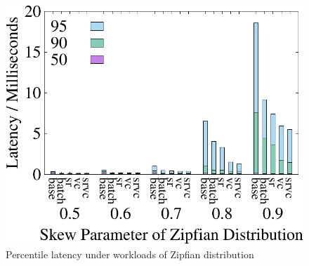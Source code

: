 \begin{figure}[t]
\begin{minipage}[b]{0.31\linewidth}
    	\label{fig:basic:latency}
    \end{minipage}
    \begin{minipage}[b]{0.31\linewidth}
    	\centering
    	\includegraphics[width=\textwidth]{./exp_fig/basic/percent95_latency}
    	\caption{Percentile latency under workloads of Zipfian distribution}
    	\label{fig:basic:p95}
    \end{minipage}
\end{figure}


